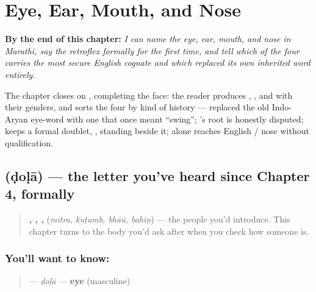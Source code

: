 
\chapter{Eye, Ear, Mouth, and Nose}
\label{ch:mr-face-parts}

\begin{chapteropening}
\textbf{By the end of this chapter:} \emph{I can name the eye, ear, mouth, and nose in Marathi, say the retroflex  formally for the first time, and tell which of the four carries the most secure English cognate and which replaced its own inherited word entirely.}

The chapter closes on , completing the face: the reader produces , ,  and  with their genders, and sorts the four by kind of history —  replaced the old Indo-Aryan eye-word with one that once meant \textquotedblleft{}swing\textquotedblright{}; 's root is honestly disputed;  keeps a formal doublet, , standing beside it;  alone reaches English  / nose without qualification.
\end{chapteropening}

\section[ḍoḷā]{ (ḍoḷā) — the letter you've heard since Chapter 4, formally}

\label{lesson:MR-C12-dola}



\begin{quote}
\textbf{, , , } (\emph{mitra, kuṭumb, bhāū, bahīṇ}) — the people you'd introduce. This chapter turns to the body you'd ask after when you check how someone is.
\end{quote}

\subsection*{You'll want to know: }
\begin{quote}
\textbf{} — \emph{ḍoḷā} — \textbf{eye} (masculine)
\end{quote}

